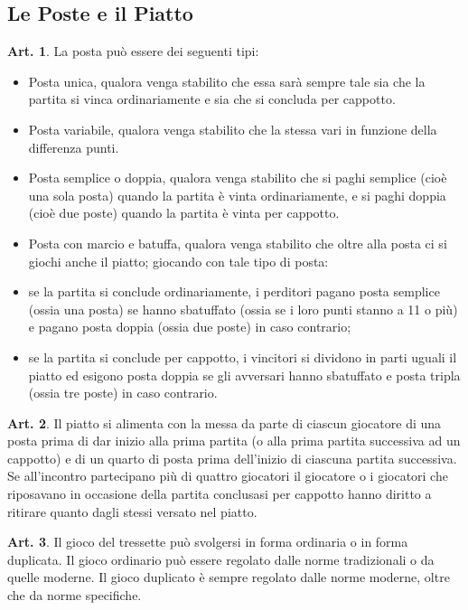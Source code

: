 \documentclass[italian,a4paper]{article}
\theoremstyle{definition}
\newtheorem{art}{Art.}
\begin{document}
\subsection{Le Poste e il Piatto}
\begin{art}
La posta può essere dei seguenti tipi:
\begin{itemize}
\item   Posta unica, qualora venga stabilito che essa sarà sempre tale sia che la partita si vinca ordinariamente e sia che si concluda per cappotto.
\item Posta variabile, qualora venga stabilito che la stessa vari in funzione della differenza punti.
\item Posta semplice o doppia, qualora venga stabilito che si paghi semplice (cioè una sola posta) quando la partita è vinta ordinariamente, e si paghi doppia (cioè due poste) quando la partita è vinta per cappotto.
\item Posta con marcio e batuffa, qualora venga stabilito che oltre alla posta ci si giochi anche il piatto; giocando con tale tipo di posta:
\item   se la partita si conclude ordinariamente, i perditori pagano posta semplice (ossia una posta) se hanno sbatuffato (ossia se i loro punti stanno a 11 o più) e pagano posta doppia (ossia due poste) in caso contrario;
\item   se la partita si conclude per cappotto, i vincitori si dividono in parti uguali il piatto ed esigono posta doppia se gli avversari hanno sbatuffato e posta tripla (ossia tre poste) in caso contrario.
    \end{itemize}
\end{art}
\begin{art}
Il piatto si alimenta con la messa da parte di ciascun giocatore di una posta prima di dar inizio alla prima partita (o alla prima partita successiva ad un cappotto) e di un quarto di posta prima dell'inizio di ciascuna partita successiva. Se all'incontro partecipano più di quattro giocatori il giocatore o i giocatori che riposavano in occasione della partita conclusasi per cappotto hanno diritto a ritirare quanto dagli stessi versato nel piatto.
\end{art}
\begin{art}
Il gioco del tressette può svolgersi in forma ordinaria o in forma duplicata.
Il gioco ordinario può essere regolato dalle norme tradizionali o da quelle moderne. Il gioco duplicato è sempre regolato dalle norme moderne, oltre che da norme specifiche.
\end{art}
\end{document}
